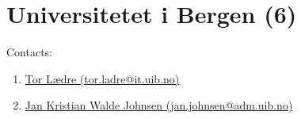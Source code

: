 


\section{Universitetet i Bergen (6)}
\label{sec:UiB}

Contacts:\begin{enumerate}
 \item {}\href{mailto:tor.ladre@it.uib.no}{Tor Lædre (tor.ladre@it.uib.no)}
 \item {}\href{mailto:jan.johnsen@adm.uib.no}{Jan Kristian Walde Johnsen (jan.johnsen@adm.uib.no)}
\end{enumerate}

